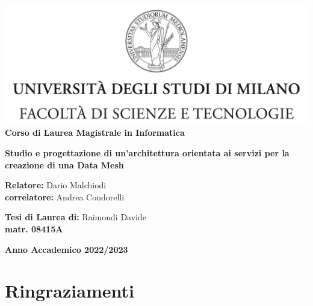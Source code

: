 \documentclass[12pt]{report}
\begin{document}
\begin{titlepage}
    \begin{center}
    \includegraphics[width=\textwidth]{immagini/tesiSCIENZE_TECNOLOGIE.jpg}\\
    {\large{\bf Corso di Laurea Magistrale in Informatica}}
    \end{center}
    \vspace{12mm}
    \begin{center}
    \vspace{4mm}
    {\huge{\bf Studio e progettazione di un'architettura orientata ai servizi per la creazione di una Data Mesh}}\\
    \end{center}
    \vspace{4mm}
    \begin{flushleft}
    {\large{\bf Relatore:}}
    {\large{Dario Malchiodi}}\\
    \vspace{4mm}
    {\large{\bf correlatore:}}
    {\large{Andrea Condorelli}}\\
    \end{flushleft}
    \vspace{12mm}
    \begin{flushright}
    {\large{\bf Tesi di Laurea di:}}
    {\large{Raimondi Davide}}\\
    {\large{\bf matr. 08415A}}\\
    \end{flushright}
    \vspace{4mm}
    \begin{center}
    {\large{\bf Anno Accademico 2022/2023}}
    \end{center}
    \end{titlepage}
    
\onehalfspacing
\tableofcontents{}
\chapter*{Ringraziamenti}
\end{document}
